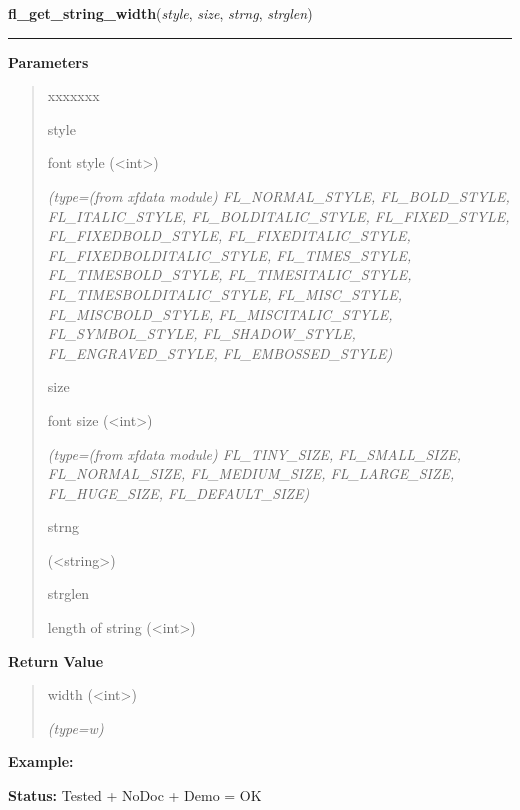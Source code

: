 \hspace{.8\funcindent}\begin{boxedminipage}{\funcwidth}

    \raggedright \textbf{fl\_get\_string\_width}(\textit{style}, \textit{size}, \textit{strng}, \textit{strglen})

    \vspace{-1.5ex}

    \rule{\textwidth}{0.5\fboxrule}
\setlength{\parskip}{2ex}
\setlength{\parskip}{1ex}
      \textbf{Parameters}
      \vspace{-1ex}

      \begin{quote}
        \begin{Ventry}{xxxxxxx}

          \item[style]

          font style ({\textless}int{\textgreater})

            {\it (type=(from xfdata module) FL\_NORMAL\_STYLE, FL\_BOLD\_STYLE, FL\_ITALIC\_STYLE,
FL\_BOLDITALIC\_STYLE, FL\_FIXED\_STYLE, FL\_FIXEDBOLD\_STYLE, 
FL\_FIXEDITALIC\_STYLE, FL\_FIXEDBOLDITALIC\_STYLE, FL\_TIMES\_STYLE, 
FL\_TIMESBOLD\_STYLE, FL\_TIMESITALIC\_STYLE, FL\_TIMESBOLDITALIC\_STYLE, 
FL\_MISC\_STYLE, FL\_MISCBOLD\_STYLE, FL\_MISCITALIC\_STYLE, 
FL\_SYMBOL\_STYLE, FL\_SHADOW\_STYLE, FL\_ENGRAVED\_STYLE, 
FL\_EMBOSSED\_STYLE)}

          \item[size]

          font size ({\textless}int{\textgreater})

            {\it (type=(from xfdata module) FL\_TINY\_SIZE, FL\_SMALL\_SIZE, FL\_NORMAL\_SIZE, 
FL\_MEDIUM\_SIZE, FL\_LARGE\_SIZE, FL\_HUGE\_SIZE, FL\_DEFAULT\_SIZE)}

          \item[strng]

          ({\textless}string{\textgreater})

          \item[strglen]

          length of string ({\textless}int{\textgreater})

        \end{Ventry}

      \end{quote}

      \textbf{Return Value}
    \vspace{-1ex}

      \begin{quote}
      width ({\textless}int{\textgreater})

      {\it (type=w)}

      \end{quote}

\textbf{Example:} 

\textbf{Status:} Tested + NoDoc + Demo = OK



    \end{boxedminipage}

